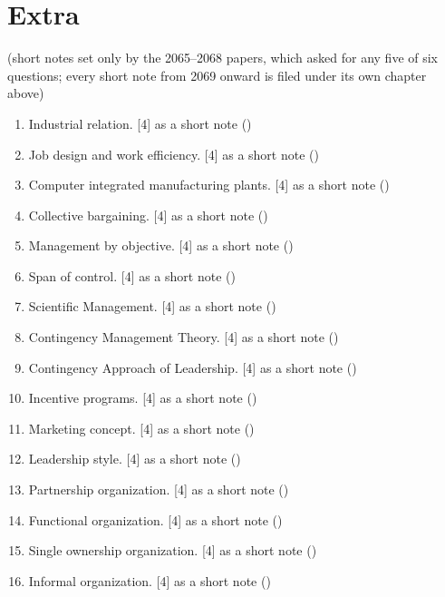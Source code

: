 \documentclass[12pt]{article}
\begin{document}
\pagebreak
\section{Extra}
\begin{center}(short notes set only by the 2065--2068 papers, which asked for any five of six questions; every short note from 2069 onward is filed under its own chapter above)\end{center}
    \begin{enumerate}[topsep=0pt, noitemsep]
      \item Industrial relation. \hfill [4] as a short note ()
      \item Job design and work efficiency. \hfill [4] as a short note ()
      \item Computer integrated manufacturing plants. \hfill [4] as a short note ()
      \item Collective bargaining. \hfill [4] as a short note ()
      \item Management by objective. \hfill [4] as a short note ()
      \item Span of control. \hfill [4] as a short note ()
      \item Scientific Management. \hfill [4] as a short note ()
      \item Contingency Management Theory. \hfill [4] as a short note ()
      \item Contingency Approach of Leadership. \hfill [4] as a short note ()
      \item Incentive programs. \hfill [4] as a short note ()
      \item Marketing concept. \hfill [4] as a short note ()
      \item Leadership style. \hfill [4] as a short note ()
      \item Partnership organization. \hfill [4] as a short note ()
      \item Functional organization. \hfill [4] as a short note ()
      \item Single ownership organization. \hfill [4] as a short note ()
      \item Informal organization. \hfill [4] as a short note ()
    \end{enumerate}
\end{document}
